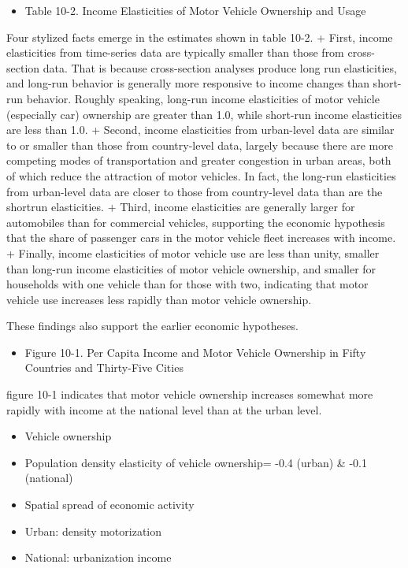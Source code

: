 \documentclass[]{article}
\providecommand{\tightlist}{%
  \setlength{\itemsep}{0pt}\setlength{\parskip}{0pt}}
\begin{document}
\begin{itemize}
\tightlist
\item
  Table 10-2. Income Elasticities of Motor Vehicle Ownership and Usage
\end{itemize}

Four stylized facts emerge in the estimates shown in table 10-2. +
First, income elasticities from time-series data are typically smaller
than those from cross-section data. That is because cross-section
analyses produce long run elasticities, and long-run behavior is
generally more responsive to income changes than short-run behavior.
Roughly speaking, long-run income elasticities of motor vehicle
(especially car) ownership are greater than 1.0, while short-run income
elasticities are less than 1.0. + Second, income elasticities from
urban-level data are similar to or smaller than those from country-level
data, largely because there are more competing modes of transportation
and greater congestion in urban areas, both of which reduce the
attraction of motor vehicles. In fact, the long-run elasticities from
urban-level data are closer to those from country-level data than are
the shortrun elasticities. + Third, income elasticities are generally
larger for automobiles than for commercial vehicles, supporting the
economic hypothesis that the share of passenger cars in the motor
vehicle fleet increases with income. + Finally, income elasticities of
motor vehicle use are less than unity, smaller than long-run income
elasticities of motor vehicle ownership, and smaller for households with
one vehicle than for those with two, indicating that motor vehicle use
increases less rapidly than motor vehicle ownership.

These findings also support the earlier economic hypotheses.

\begin{itemize}
\tightlist
\item
  Figure 10-1. Per Capita Income and Motor Vehicle Ownership in Fifty
  Countries and Thirty-Five Cities
\end{itemize}

figure 10-1 indicates that motor vehicle ownership increases somewhat
more rapidly with income at the national level than at the urban level.

\begin{itemize}
\tightlist
\item
  Vehicle ownership
\item
  Population density elasticity of vehicle ownership= -0.4 (urban) \&
  -0.1 (national)
\item
  Spatial spread of economic activity
\item
  Urban: density motorization
\item
  National: urbanization income
\end{itemize}
\end{document}
